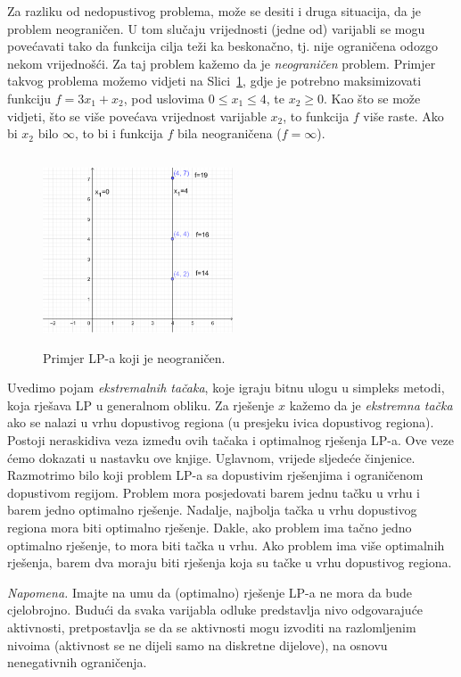 \documentclass[a4paper, utf8, 11pt, colorlinks]{book}
\begin{document}
 Za razliku od nedopustivog problema, može se desiti i druga situacija, da je problem neograničen. U tom slučaju vrijednosti (jedne od) varijabli se mogu povećavati tako da funkcija cilja teži ka beskonačno, tj. nije ograničena odozgo nekom vrijednošći. Za taj problem kažemo da je \emph{neograničen} problem. Primjer takvog problema možemo vidjeti na Slici~\ref{fig:unbounded_solution}, gdje je potrebno maksimizovati funkciju $f = 3 x_1 + x_2$, pod uslovima $0\leq x_1 \leq 4$, te $x_2 \geq 0$. Kao što se može vidjeti, što se više povećava vrijednost varijable $x_2$, to funkcija $f$ više raste. Ako bi $x_2$ bilo $\infty$, to bi i funkcija $f$ bila neograničena ($f = \infty$).
 
  \begin{figure}
     \centering
     \includegraphics[width=160pt, height=160pt]{fig4.eps}
     \caption{Primjer LP-a koji je neograničen.}
     \label{fig:unbounded_solution}
 \end{figure}
 
Uvedimo pojam \emph{ekstremalnih tačaka}, koje igraju bitnu ulogu u simpleks metodi, koja rješava LP u generalnom obliku. Za rješenje $x$ kažemo da je \emph{ekstremna tačka} ako se nalazi u vrhu dopustivog regiona (u presjeku ivica dopustivog regiona).  Postoji neraskidiva veza između ovih tačaka i optimalnog rješenja LP-a. Ove veze ćemo dokazati u nastavku ove knjige. Uglavnom, vrijede sljedeće činjenice. 
Razmotrimo bilo koji problem LP-a sa dopustivim rješenjima i ograničenom dopustivom regijom. Problem mora posjedovati barem jednu tačku u vrhu i barem jedno optimalno rješenje. Nadalje, najbolja tačka u vrhu dopustivog regiona mora biti optimalno rješenje. Dakle, ako problem ima tačno jedno optimalno rješenje, to mora biti tačka u vrhu. Ako problem ima više optimalnih rješenja, barem dva moraju biti rješenja koja su tačke u vrhu dopustivog regiona.

\textit{Napomena.} Imajte na umu da (optimalno) rješenje LP-a ne mora da bude cjelobrojno. Budući da svaka varijabla odluke predstavlja nivo odgovarajuće aktivnosti, pretpostavlja se da se aktivnosti mogu izvoditi na razlomljenim nivoima (aktivnost  se ne dijeli samo na diskretne dijelove), na osnovu nenegativnih ograničenja.  
\end{document}
